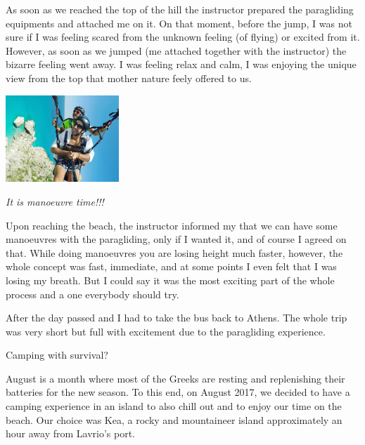\documentclass[10pt,a4paper]{article} %
\newcommand{\NewsItem}[1]{ %
\usefont{T1}{fvs}{n}{n} %
\vspace{24pt}\large #1\vspace{3pt} %
\par \normalsize \normalfont}
\begin{document}
\begin{multicols}{3}
As soon as we reached the top of the hill the instructor prepared the paragliding 
equipments and attached me on it. 
On that moment, before the jump, I was not sure if I was feeling scared from the 
unknown feeling (of flying) or excited from it. 
However, as soon as we jumped (me attached together with the instructor) the 
bizarre feeling went away. 
I was feeling relax and calm, I was enjoying the unique view from the top that 
mother nature feely offered to us. 


\begin{center}
	\includegraphics[width=0.32\textwidth]{media/paragliding.jpg}
	\par\textit{It is manoeuvre time!!!}
\end{center}


Upon reaching the beach, the instructor informed my that we can have some manoeuvres 
with the paragliding, only if I wanted it, and of course I agreed on that. 
While doing manoeuvres you are losing height much faster, however, the whole concept 
was fast, immediate, and at some points I even felt that I was losing my breath. 
But I could say it was the most exciting part of the whole process and a one everybody 
should try. 


After the day passed and I had to take the bus back to Athens. 
The whole trip was very short but full with excitement due to the paragliding 
experience.

\NewsItem{Camping with survival?}

August is a month where most of the Greeks are resting and replenishing their 
batteries for the new season. 
To this end, on August 2017, we decided to have a camping experience in an island to also chill 
out and to enjoy our time on the beach. 
Our choice was Kea, a rocky and mountaineer island approximately an hour away 
from Lavrio's port.



\end{multicols}
\end{document}
